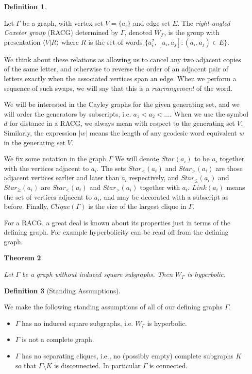 \documentclass{amsart}
\newtheorem{theorem}{Theorem}[subsection]
\theoremstyle{definition}
\newtheorem{definition}[theorem]{Definition}
\theoremstyle{remark}
\begin{document}
	\begin{definition} \label{RACGDef}
		
		Let $\Gamma$ be a graph, with vertex set $V=\{a_i\}$ and edge set $E$. The \textit{right-angled Coxeter group} (RACG) determined by $\Gamma$, denoted $W_\Gamma$, is the group with presentation $\langle V| R\rangle$ where $R$ is the set of words $\{a_i^2, [a_i,a_j]: (a_i,a_j)\in E\}$.
		
	\end{definition}
	
	We think about these relations as allowing us to cancel any two adjacent copies of the same letter, and otherwise to reverse the order of an adjacent pair of letters exactly when the associated vertices span an edge. When we perform a sequence of such swaps, we will say that this is a \textit{rearrangement} of the word.
	
	We will be interested in the Cayley graphs for the given generating set, and we will order the generators by subscripts, i.e. $a_1<a_2<...$. When we use the symbol $d$ for distance in a RACG, we always mean with respect to the generating set $V$. Similarly, the expression $|w|$ means the length of any geodesic word equivalent $w$ in the generating set $V$.
	
	We fix some notation in the graph $\Gamma$ We will denote $Star(a_i)$ to be $a_i$ together with the vertices adjacent to $a_i$. The sets $Star_<(a_i)$ and $Star_>(a_i)$ are those adjacent vertices earlier and later than $a_i$ respectively, and $Star_\le(a_i)$ and $Star_\ge(a_i)$ are $Star_<(a_i)$ and $Star_>(a_i)$ together with $a_i$. $Link(a_i)$ means the set of vertices adjacent to $a_i$, and may be decorated with a subscript as before. Finally, $Clique(\Gamma)$ is the size of the largest clique in $\Gamma$.
	
	For a RACG, a great deal is known about its properties just in terms of the defining graph. For example hyperbolicity can be read off from the defining graph.
	
	\begin{theorem} \cite{Moussong}
		
		Let $\Gamma$ be a graph without induced square subgraphs. Then $W_\Gamma$ is hyperbolic.
		
	\end{theorem}
	
	
	
	\begin{definition}[Standing Assumptions] \label{StandingAssumptions}
		
		We make the following standing assumptions of all of our defining graphs $\Gamma$.		
		\begin{itemize}
			\item $\Gamma$ has no induced square subgraphs, i.e. $W_\Gamma$ is hyperbolic.
			\item $\Gamma$ is not a complete graph.
			\item $\Gamma$ has no separating cliques, i.e., no (possibly empty) complete subgraphs $K$ so that $\Gamma\setminus K$ is disconnected. In particular $\Gamma$ is connected.
		\end{itemize}	
	\end{definition}
	
\end{document}
